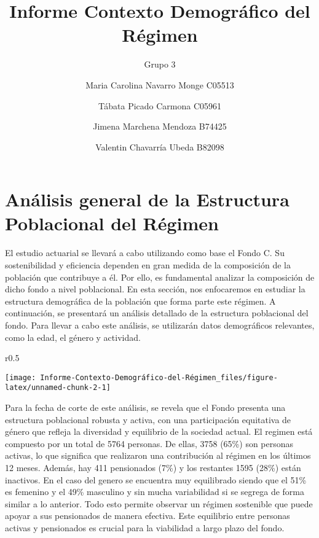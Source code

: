 \documentclass[
]{article}
\title{Informe Contexto Demográfico del Régimen}
\subtitle{Grupo 3}
\author{Maria Carolina Navarro Monge C05513 \and Tábata Picado Carmona
C05961 \and Jimena Marchena Mendoza B74425 \and Valentin Chavarría Ubeda
B82098}
\date{}
\begin{document}
\maketitle

{
\setcounter{tocdepth}{2}
\tableofcontents
}
\newpage

\hypertarget{anuxe1lisis-general-de-la-estructura-poblacional-del-ruxe9gimen}{%
\section{Análisis general de la Estructura Poblacional del
Régimen}\label{anuxe1lisis-general-de-la-estructura-poblacional-del-ruxe9gimen}}

El estudio actuarial se llevará a cabo utilizando como base el Fondo C.
Su sostenibilidad y eficiencia dependen en gran medida de la composición
de la población que contribuye a él. Por ello, es fundamental analizar
la composición de dicho fondo a nivel poblacional. En esta sección, nos
enfocaremos en estudiar la estructura demográfica de la población que
forma parte este régimen. A continuación, se presentará un análisis
detallado de la estructura poblacional del fondo. Para llevar a cabo
este análisis, se utilizarán datos demográficos relevantes, como la
edad, el género y actividad.

\begin{wrapfigure}[15]{r}{0.5\textwidth}

 \centering

\begin{flushright}\texttt{[image: Informe-Contexto-Demográfico-del-Régimen\_files/figure-latex/unnamed-chunk-2-1]} \end{flushright}
 

\end{wrapfigure}

Para la fecha de corte de este análisis, se revela que el Fondo presenta
una estructura poblacional robusta y activa, con una participación
equitativa de género que refleja la diversidad y equilibrio de la
sociedad actual. El regimen está compuesto por un total de 5764
personas. De ellas, 3758 (65\%) son personas activas, lo que significa
que realizaron una contribución al régimen en los últimos 12 meses.
Además, hay 411 pensionados (7\%) y los restantes 1595 (28\%) están
inactivos. En el caso del genero se encuentra muy equilibrado siendo que
el 51\% es femenino y el 49\% masculino y sin mucha variabilidad si se
segrega de forma similar a lo anterior. Todo esto permite observar un
régimen sostenible que puede apoyar a sus pensionados de manera
efectiva. Este equilibrio entre personas activas y pensionados es
crucial para la viabilidad a largo plazo del fondo.
\end{document}

